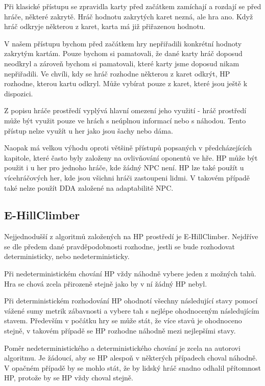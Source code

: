Při klasické přístupu se zpravidla karty před začátkem zamíchají a rozdají se před hráče, některé zakrytě. Hráč hodnotu zakrytých karet nezná, ale hra ano. Když hráč odkryje některou z karet, karta má již přiřazenou hodnotu. 

V našem přístupu bychom před začátkem hry nepřiřadili konkrétní hodnoty zakrytým kartám. Pouze bychom si pamatovali, že dané karty hráč doposud neodkryl a zároveň bychom si pamatovali, které karty jsme doposud nikam nepřiřadili. Ve chvíli, kdy se hráč rozhodne některou z karet odkrýt, HP rozhodne, kterou kartu odkryl. Může vybírat pouze z karet, které jsou ještě k dispozici.

Z popisu hráče prostředí vyplývá hlavní omezení jeho využití - hráč prostředí může být využit pouze ve hrách s neúplnou informací nebo s náhodou. Tento přístup nelze využít u her jako jsou šachy nebo dáma.

Naopak má velkou výhodu oproti většině přístupů popsaných v předcházejících kapitole, které často byly založeny na ovlivňování oponentů ve hře. HP může být použit i u her pro jednoho hráče, kde žádný NPC není. HP lze také použít u vícehráčových her, kde jsou všichni hráči zastoupeni lidmi. V takovém případě také nelze použít DDA založené na adaptabilitě NPC.

\subsection{E-HillClimber}

Nejjednodušší z algoritmů založených na HP prostředí je E-HillClimber. Nejdříve se dle předem dané pravděpodobnosti rozhodne, jestli se bude rozhodovat deterministicky, nebo nedeterministicky.

Při nedeterministickém chování HP vždy náhodně vybere jeden z možných tahů. Hra se chová zcela přirozeně stejně jako by v ní žádný HP nebyl.

Při deterministickém rozhodování HP ohodnotí všechny následující stavy pomocí vážené sumy metrik zábavnosti a vybere tah s nejlépe ohodnoceným následujícím stavem. Především v počátku hry se může stát, že více stavů je ohodnoceno stejně, v takovém případě se HP rozhodne náhodně mezi nejlepšími stavy.

Poměr nedeterministického a deterministického chování je zcela na autorovi algoritmu. Je žádoucí, aby se HP alespoň v některých případech choval náhodně. V opačném případě by se mohlo stát, že by lidský hráč snadno odhalil přítomnost HP, protože by se HP vždy choval stejně.

